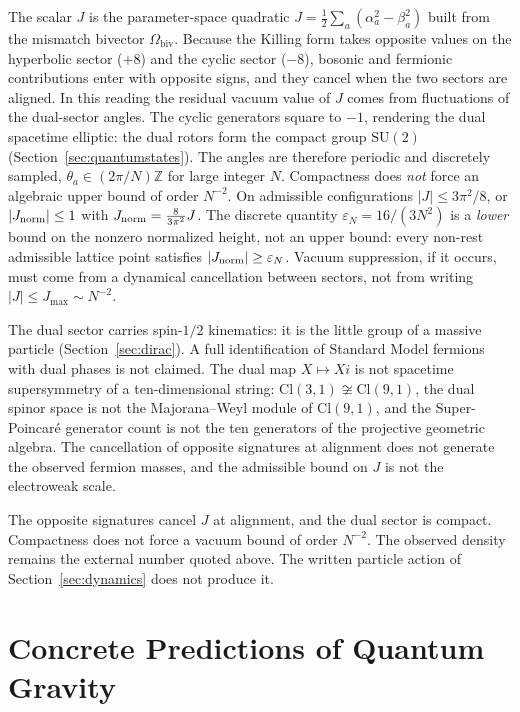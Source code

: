 \documentclass[a4paper]{article}
\begin{document}
The scalar \(J\) is the parameter-space quadratic \(J=\frac12\sum_a(\alpha_a^2-\beta_a^2)\) built from the mismatch bivector \(\Omega_\text{biv}\). Because the Killing form takes opposite values on the hyperbolic sector (\(+8\)) and the cyclic sector (\(-8\)), bosonic and fermionic contributions enter with opposite signs, and they cancel when the two sectors are aligned. In this reading the residual vacuum value of \(J\) comes from fluctuations of the dual-sector angles. The cyclic generators square to \(-1\), rendering the dual spacetime elliptic: the dual rotors form the compact group \(\mathrm{SU}(2)\) (Section~\ref{sec:quantumstates}). The angles are therefore periodic and discretely sampled, \(\theta_a \in (2\pi/N)\mathbb{Z}\) for large integer \(N\). Compactness does \emph{not} force an algebraic upper bound of order \(N^{-2}\). On admissible configurations \(|J|\le 3\pi^2/8\), or \(|J_{\rm norm}|\le 1\) with \(J_{\rm norm}=\frac8{3\pi^2}J\). The discrete quantity \(\varepsilon_N=16/(3N^2)\) is a \emph{lower} bound on the nonzero normalized height, not an upper bound: every non-rest admissible lattice point satisfies \(|J_{\rm norm}|\ge\varepsilon_N\). Vacuum suppression, if it occurs, must come from a dynamical cancellation between sectors, not from writing \(|J|\le J_{\max}\sim N^{-2}\).

The dual sector carries spin-$1/2$ kinematics: it is the little group of a massive particle (Section~\ref{sec:dirac}). A full identification of Standard Model fermions with dual phases is not claimed. The dual map $X\mapsto Xi$ is not spacetime supersymmetry of a ten-dimensional string: $\mathrm{Cl}(3,1)\not\cong\mathrm{Cl}(9,1)$, the dual spinor space is not the Majorana--Weyl module of $\mathrm{Cl}(9,1)$, and the Super-Poincar\'e generator count is not the ten generators of the projective geometric algebra. The cancellation of opposite signatures at alignment does not generate the observed fermion masses, and the admissible bound on \(J\) is not the electroweak scale.

The opposite signatures cancel \(J\) at alignment, and the dual sector is compact. Compactness does not force a vacuum bound of order \(N^{-2}\). The observed density remains the external number quoted above. The written particle action of Section~\ref{sec:dynamics} does not produce it.

\section{Concrete Predictions of Quantum Gravity}
\label{sec:predictions}
\end{document}
